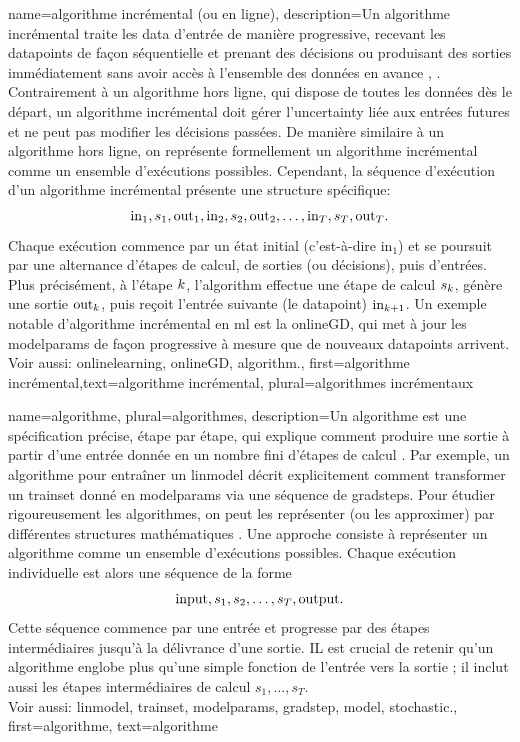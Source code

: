 {name={algorithme incrémental (ou en ligne)},
	description={Un algorithme incrémental traite les \gls{data} d’entrée de manière progressive, recevant les \glspl{datapoint} de façon séquentielle et prenant des décisions ou produisant des sorties immédiatement sans avoir accès à l’ensemble des données en avance \cite{PredictionLearningGames}, \cite{HazanOCO}. Contrairement à un algorithme hors ligne, qui dispose de toutes les données dès le départ, un algorithme incrémental doit gérer l’\gls{uncertainty} liée aux entrées futures et ne peut pas modifier les décisions passées.  
		De manière similaire à un algorithme hors ligne, on représente formellement un algorithme incrémental comme un ensemble d’exécutions possibles. Cependant, la séquence d’exécution d’un algorithme incrémental présente une structure spécifique:  
		$${\rm in}_{1}, s_1, {\rm out}_{1}, {\rm in}_{2}, s_2, {\rm out}_{2}, \ldots, {\rm in}_{T}, s_T, {\rm out}_{T}.$$  
		Chaque exécution commence par un état initial (c’est-à-dire \(\text{in}_{1}\)) et se poursuit par une alternance d’étapes de calcul, de sorties (ou décisions), puis d’entrées. Plus précisément, à l’étape \(k\), l’\gls{algorithm} effectue une étape de calcul \(s_{k}\), génère une sortie \(\text{out}_{k}\), puis reçoit l’entrée suivante (le \gls{datapoint}) \(\text{in}_{k+1}\).  
		Un exemple notable d’algorithme incrémental en \gls{ml} est la \gls{onlineGD}, qui met à jour les \glspl{modelparam} de façon progressive à mesure que de nouveaux \glspl{datapoint} arrivent.  
		\\ Voir aussi: \gls{onlinelearning}, \gls{onlineGD}, \gls{algorithm}.},
	first={algorithme incrémental},text={algorithme incrémental}, plural={algorithmes incrémentaux}}

{name={algorithme}, plural={algorithmes},
	description={Un algorithme est une spécification précise, étape par étape, qui explique comment produire une sortie à partir d’une entrée donnée en un nombre fini d’étapes de calcul \cite{Cormen:2022aa}.  
		Par exemple, un algorithme pour entraîner un \gls{linmodel} décrit explicitement comment transformer un \gls{trainset} donné en \glspl{modelparam} via une séquence de \glspl{gradstep}.  
		Pour étudier rigoureusement les algorithmes, on peut les représenter (ou les approximer) par différentes structures mathématiques \cite{Sipser2013}.  
		Une approche consiste à représenter un algorithme comme un ensemble d’exécutions possibles. Chaque exécution individuelle est alors une séquence de la forme $${\rm input}, s_1, s_2, \ldots, s_T, {\rm output}.$$  
		Cette séquence commence par une entrée et progresse par des étapes intermédiaires jusqu’à la délivrance d’une sortie.  
		IL est crucial de retenir qu'un algorithme englobe plus qu’une simple fonction de l’entrée vers la sortie ; il inclut aussi les étapes intermédiaires de calcul $s_1, \ldots, s_T$.
		\\
		Voir aussi: \gls{linmodel}, \gls{trainset}, \glspl{modelparam}, \gls{gradstep}, \gls{model}, \gls{stochastic}.},
	first={algorithme},
	text={algorithme}
}

